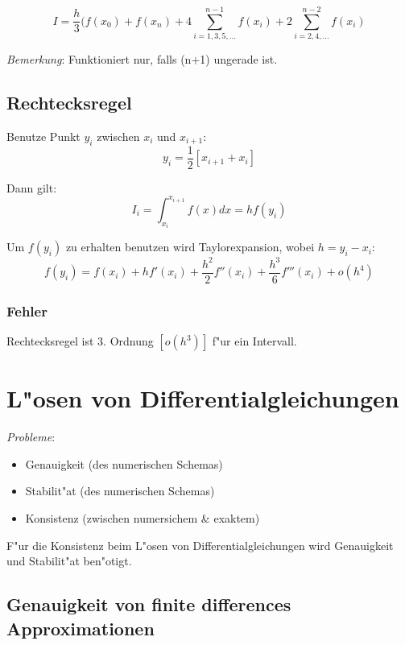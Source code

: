 \documentclass[german, 10pt, a4paper, twocolumn]{scrartcl}
\begin{document}
\begin{displaymath}
	I = \frac{h}{3} (f(x_0) + f(x_n) + 4 \sum^{n-1}_{i=1,3,5,\ldots}f(x_i) + 2 \sum^{n-2}_{i=2,4,\ldots}f(x_i)
\end{displaymath}

\textit{Bemerkung}: Funktioniert nur, falls (n+1) ungerade ist.

\subsection{Rechtecksregel}

Benutze Punkt $y_i$ zwischen $x_i$ und $x_{i+1}$:
\begin{displaymath}
	y_i = \frac{1}{2}[x_{i+1}+x_i]
\end{displaymath}

Dann gilt:
\begin{displaymath}
	I_i = \int^{x_{i+1}}_{x_i} f(x)dx = h f(y_i)
\end{displaymath}

Um $f(y_i)$ zu erhalten benutzen wird Taylorexpansion, wobei $h=y_i - x_i$:
\begin{displaymath}
	f(y_i) = f(x_i) + hf'(x_i)+\frac{h^2}{2} f''(x_i) + \frac{h^3}{6} f'''(x_i) + o(h^4)
\end{displaymath}

\subsubsection{Fehler}

Rechtecksregel ist 3. Ordnung $[o(h^3)]$ f"ur ein Intervall.

\section{L"osen von Differentialgleichungen}

\textit{Probleme}:
\begin{itemize}
	\item Genauigkeit (des numerischen Schemas)
	\item Stabilit"at (des numerischen Schemas)
	\item Konsistenz (zwischen numersichem \& exaktem)
\end{itemize}

F"ur die Konsistenz beim L"osen von Differentialgleichungen wird Genauigkeit und Stabilit"at ben"otigt.

\subsection{Genauigkeit von finite differences Approximationen}
\end{document}
